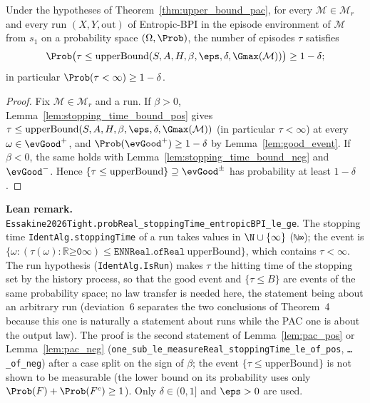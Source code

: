 \begin{theorem}\label{thm:upper_bound_complexity}
\leanok
{}
Under the hypotheses of Theorem~\ref{thm:upper_bound_pac}, for every $\mathcal M \in \mathcal M_r$
and every run $(X, Y, \mathrm{out})$ of Entropic-BPI in the episode environment of $\mathcal M$
from $s_1$ on a probability space $(\Omega, \Prob)$, the number of episodes $\tau$ satisfies
\[
  \Prob\big(\tau \le \mathrm{upperBound}(S, A, H, \beta, \eps, \delta, \Gmax(\mathcal M))\big) \ge 1 - \delta ;
\]
in particular $\Prob(\tau < \infty) \ge 1 - \delta$.
\end{theorem}

\begin{proof}
\leanok
Fix $\mathcal M \in \mathcal M_r$ and a run. If $\beta > 0$, Lemma~\ref{lem:stopping_time_bound_pos}
gives $\tau \le \mathrm{upperBound}(S,A,H,\beta,\eps,\delta,\Gmax(\mathcal M))$ (in particular
$\tau < \infty$) at every $\omega \in \evGood^+$, and $\Prob(\evGood^+) \ge 1 - \delta$ by
Lemma~\ref{lem:good_event}. If $\beta < 0$, the same holds with
Lemma~\ref{lem:stopping_time_bound_neg} and $\evGood^-$. Hence
$\{\tau \le \mathrm{upperBound}\} \supseteq \evGood^\pm$ has probability at least $1 - \delta$.
\end{proof}

\textbf{Lean remark.} \texttt{Essakine2026Tight.probReal\_stoppingTime\_entropicBPI\_le\_ge}.
The stopping time \texttt{IdentAlg.stoppingTime} of a run takes values in $\N \cup \{\infty\}$
(\texttt{ℕ∞}); the event is $\{\omega : (\tau(\omega) : \texttt{ℝ≥0∞}) \le \texttt{ENNReal.ofReal}\ \mathrm{upperBound}\}$,
which contains $\tau < \infty$. The run hypothesis (\texttt{IdentAlg.IsRun}) makes
$\tau$ the hitting time of the stopping set by the history process, so that the good event and
$\{\tau \le B\}$ are events of the same probability space; no law transfer is needed here, the
statement being about an arbitrary run (deviation~6 separates the two conclusions of Theorem~4
because this one is naturally a statement about runs while the PAC one is about the output law).
The proof is the second statement of Lemma~\ref{lem:pac_pos} or Lemma~\ref{lem:pac_neg}
(\texttt{one\_sub\_le\_measureReal\_stoppingTime\_le\_of\_pos}, \texttt{…\_of\_neg}) after a case split on the sign
of $\beta$; the event $\{\tau \le \mathrm{upperBound}\}$ is not shown to be measurable (the lower bound on its
probability uses only $\Prob(F) + \Prob(F^c) \ge 1$). Only $\delta \in (0, 1]$ and $\eps > 0$ are used.

